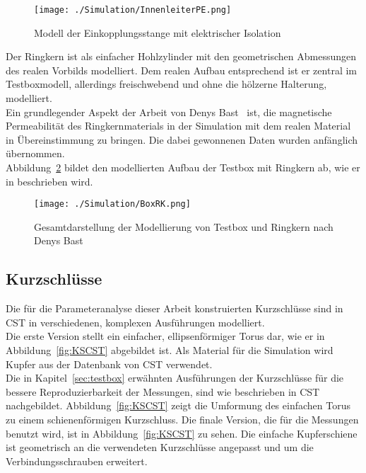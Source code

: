             \begin{figure}[htb]
                \centering
                \texttt{[image: ./Simulation/InnenleiterPE.png]}
                \caption{Modell der Einkopplungsstange mit elektrischer Isolation}
                \label{fig:InnenleiterCST}
            \end{figure}
        
        Der Ringkern ist als einfacher Hohlzylinder mit den geometrischen Abmessungen des realen Vorbilds modelliert. Dem realen Aufbau entsprechend ist er zentral im Testboxmodell, allerdings freischwebend und ohne die hölzerne Halterung, modelliert.\\
        Ein grundlegender Aspekt der Arbeit von Denys Bast~\citep{bast2017ba} ist, die magnetische Permeabilität des Ringkernmaterials in der Simulation mit dem realen Material in Übereinstimmung zu bringen. Die dabei gewonnenen Daten wurden anfänglich übernommen.\\
        Abbildung~\ref{fig:BoxRKCST} bildet den modellierten Aufbau der Testbox mit Ringkern ab, wie er in \citep{bast2017ba} beschrieben wird.
        
            \begin{figure}[htb]
                \centering
                \texttt{[image: ./Simulation/BoxRK.png]}
                \caption{Gesamtdarstellung der Modellierung von Testbox und Ringkern nach Denys Bast~\citep{bast2017ba}}
                \label{fig:BoxRKCST}
            \end{figure}
        
        \subsection{Kurzschlüsse}
        Die für die Parameteranalyse dieser Arbeit konstruierten Kurzschlüsse sind in CST in verschiedenen, komplexen Ausführungen modelliert.\\
        Die erste Version stellt ein einfacher, ellipsenförmiger Torus dar, wie er in Abbildung~\ref{fig:KSCST} abgebildet ist. Als Material für die Simulation wird Kupfer aus der Datenbank von CST verwendet.\\
        Die in Kapitel~\ref{sec:testbox} erwähnten Ausführungen der Kurzschlüsse für die bessere Reproduzierbarkeit der Messungen, sind wie beschrieben in CST nachgebildet. Abbildung~\ref{fig:KSCST} zeigt die Umformung des einfachen Torus zu einem schienenförmigen Kurzschluss. Die finale Version, die für die Messungen benutzt wird, ist in Abbildung~\ref{fig:KSCST} zu sehen. Die einfache Kupferschiene ist geometrisch an die verwendeten Kurzschlüsse angepasst und um die Verbindungsschrauben erweitert.
        
